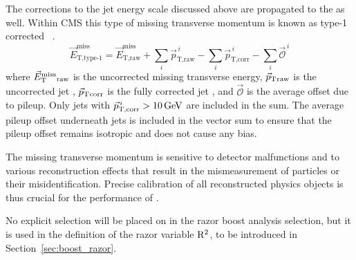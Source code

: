 The corrections to the jet energy scale discussed above are propagated to the \VEtmiss as well. 
Within CMS this type of missing transverse momentum is known as type-1 corrected
\VEtmiss~\cite{Khachatryan:2014gga}.
\begin{equation}
  {\vec E}_{\mathrm{T}\text{,type-1}}^{\text{miss}} = 
  {\vec E}_{\mathrm{T}\text{,raw}}^{\text{miss}} + \sum_i {\vec p}^{\,i}_{\mathrm{T}\text{,raw}}
 - \sum_i {\vec p}^{\,i}_{\mathrm{T}\text{,corr}} - \sum_i \vec{\mathcal{O}}^{\,i}
\end{equation}
where ${\vec E}_{\mathrm{T}}^{\text{miss}}{}_{\mathrm{raw}}$ is the uncorrected missing transverse energy,
${\vec p}_{\mathrm{T}}{}_{\mathrm{raw}}$ is the uncorrected jet \pt, ${\vec p}_{\mathrm{T}}{}_{\mathrm{corr}}$ is the fully
corrected jet \pt, and $\vec{\mathcal{O}}$ is the average offset due to pileup. 
Only jets with ${\vec p}^{\,i}_{\mathrm{T}\text{,corr}} > 10 \,\text{Ge\hspace{-.08em}V}$ are included in the sum.
The average pileup offset underneath jets is included in the \ETm vector sum to ensure that the
pileup offset remains isotropic and does not cause any bias.

The missing transverse momentum is sensitive to detector malfunctions and to various
reconstruction effects that result in the mismeasurement of particles or their misidentification.
Precise calibration of all reconstructed physics objects is thus crucial for the performance of
\VEtmiss. 

No explicit selection will be placed on \ETm in the razor boost analysis selection, but it is
used in the definition of the razor variable $\mathrm{R^2}$, to be introduced in
Section~\ref{sec:boost_razor}.

